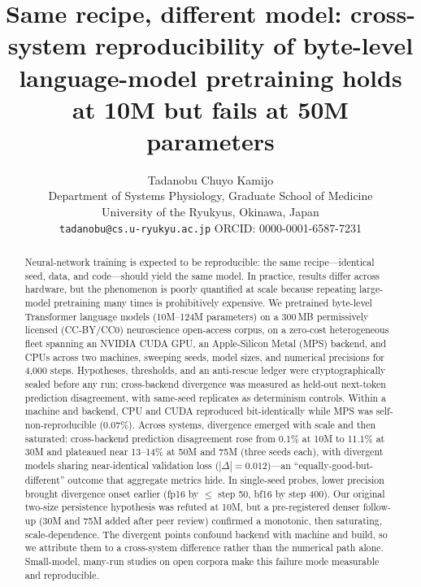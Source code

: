 \documentclass{article}
\title{Same recipe, different model: cross-system reproducibility of byte-level language-model pretraining holds at 10M but fails at 50M parameters}
\author{Tadanobu Chuyo Kamijo\\Department of Systems Physiology, Graduate School of Medicine\\University of the Ryukyus, Okinawa, Japan\\\texttt{tadanobu@cs.u-ryukyu.ac.jp} \quad ORCID: 0000-0001-6587-7231}
\begin{document}
\maketitle
\begin{abstract}
Neural-network training is expected to be reproducible: the same recipe---identical seed, data, and code---should yield the same model. In practice, results differ across hardware, but the phenomenon is poorly quantified at scale because repeating large-model pretraining many times is prohibitively expensive. We pretrained byte-level Transformer language models (10M--124M parameters) on a 300\,MB permissively licensed (CC-BY/CC0) neuroscience open-access corpus, on a zero-cost heterogeneous fleet spanning an NVIDIA CUDA GPU, an Apple-Silicon Metal (MPS) backend, and CPUs across two machines, sweeping seeds, model sizes, and numerical precisions for 4{,}000 steps. Hypotheses, thresholds, and an anti-rescue ledger were cryptographically sealed before any run; cross-backend divergence was measured as held-out next-token prediction disagreement, with same-seed replicates as determinism controls. Within a machine and backend, CPU and CUDA reproduced bit-identically while MPS was self-non-reproducible (0.07\%). Across systems, divergence emerged with scale and then saturated: cross-backend prediction disagreement rose from 0.1\% at 10M to 11.1\% at 30M and plateaued near 13--14\% at 50M and 75M (three seeds each), with divergent models sharing near-identical validation loss ($|\Delta|=0.012$)---an ``equally-good-but-different'' outcome that aggregate metrics hide. In single-seed probes, lower precision brought divergence onset earlier (fp16 by $\le$ step 50, bf16 by step 400). Our original two-size persistence hypothesis was refuted at 10M, but a pre-registered denser follow-up (30M and 75M added after peer review) confirmed a monotonic, then saturating, scale-dependence. The divergent points confound backend with machine and build, so we attribute them to a cross-system difference rather than the numerical path alone. Small-model, many-run studies on open corpora make this failure mode measurable and reproducible.
\end{abstract}
\end{document}
